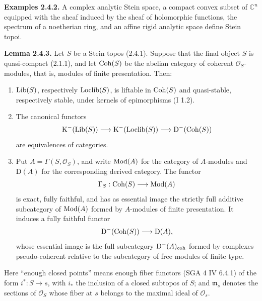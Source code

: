 \documentclass[11pt]{article}
\begin{document}
\textbf{Examples 2.4.2.} A complex analytic Stein space, a compact convex subset of $\mathbb C^n$ equipped with the sheaf induced by the sheaf of holomorphic functions, the spectrum of a noetherian ring, and an affine rigid analytic space define Stein topoi.

\textbf{Lemma 2.4.3.} Let $S$ be a Stein topos (2.4.1). Suppose that the final object $S$ is quasi-compact (2.1.1), and let $\operatorname{Coh}(S)$ be the abelian category of coherent $\mathcal O_S$-modules, that is, modules of finite presentation. Then:
\begin{enumerate}[label=\alph*)]
\item $\operatorname{Lib}(S)$, respectively $\operatorname{Loclib}(S)$, is liftable in $\operatorname{Coh}(S)$ and quasi-stable, respectively stable, under kernels of epimorphisms (I 1.2).
\item The canonical functors
\[
\mathrm K^{-}(\operatorname{Lib}(S))\longrightarrow \mathrm K^{-}(\operatorname{Loclib}(S))\longrightarrow \mathrm D^{-}(\operatorname{Coh}(S))
\]
are equivalences of categories.
\item Put $A=\Gamma(S,\mathcal O_S)$, and write $\operatorname{Mod}(A)$ for the category of $A$-modules and $\mathrm D(A)$ for the corresponding derived category. The functor
\[
\Gamma_S:\operatorname{Coh}(S)\longrightarrow\operatorname{Mod}(A)
\]
is exact, fully faithful, and has as essential image the strictly full additive subcategory of $\operatorname{Mod}(A)$ formed by $A$-modules of finite presentation. It induces a fully faithful functor
\[
\mathrm D^{-}(\operatorname{Coh}(S))\longrightarrow\mathrm D(A),
\]
whose essential image is the full subcategory $\mathrm D^{-}(A)_{\mathrm{coh}}$ formed by complexes pseudo-coherent relative to the subcategory of free modules of finite type.
\end{enumerate}
Here ``enough closed points'' means enough fiber functors (SGA 4 IV 6.4.1) of the form $i^*:S\to s$, with $i_*$ the inclusion of a closed subtopos of $S$; and $\mathfrak m_s$ denotes the sections of $\mathcal O_S$ whose fiber at $s$ belongs to the maximal ideal of $\mathcal O_s$.
\end{document}
